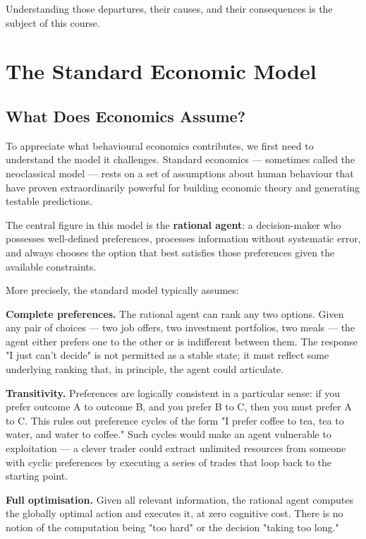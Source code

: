\documentclass[12pt, letterpaper]{article}
\begin{document}
Understanding those departures, their causes, and their consequences is the subject of this course.

\medskip


\section{The Standard Economic Model}



\subsection{What Does Economics Assume?}


To appreciate what behavioural economics contributes, we first need to understand the model it challenges. Standard economics --- sometimes called the neoclassical model --- rests on a set of assumptions about human behaviour that have proven extraordinarily powerful for building economic theory and generating testable predictions.

The central figure in this model is the \textbf{rational agent}: a decision-maker who possesses well-defined preferences, processes information without systematic error, and always chooses the option that best satisfies those preferences given the available constraints.

More precisely, the standard model typically assumes:

\textbf{Complete preferences.} The rational agent can rank any two options. Given any pair of choices --- two job offers, two investment portfolios, two meals --- the agent either prefers one to the other or is indifferent between them. The response "I just can't decide" is not permitted as a stable state; it must reflect some underlying ranking that, in principle, the agent could articulate.

\textbf{Transitivity.} Preferences are logically consistent in a particular sense: if you prefer outcome A to outcome B, and you prefer B to C, then you must prefer A to C. This rules out preference cycles of the form "I prefer coffee to tea, tea to water, and water to coffee." Such cycles would make an agent vulnerable to exploitation --- a clever trader could extract unlimited resources from someone with cyclic preferences by executing a series of trades that loop back to the starting point.

\textbf{Full optimisation.} Given all relevant information, the rational agent computes the globally optimal action and executes it, at zero cognitive cost. There is no notion of the computation being "too hard" or the decision "taking too long."
\end{document}

